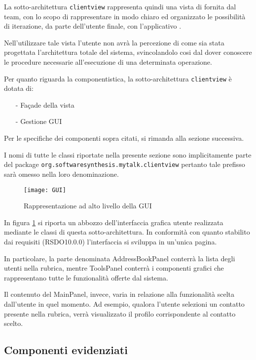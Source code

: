 La sotto-architettura \texttt{clientview} rappresenta quindi una vista di  fornita dal team, con lo scopo di rappresentare in modo chiaro ed organizzato le possibilità di iterazione, da parte dell'utente finale, con l'applicativo \caName.

Nell'utilizzare tale vista l'utente non avrà la percezione di come sia stata progettata l'architettura totale del sistema, svincolandolo cosi dal dover conoscere le procedure necessarie all'esecuzione di una determinata operazione.

Per quanto riguarda la componentistica, la sotto-architettura \texttt{clientview} è dotata di:
\begin{itemize}[noitemsep,nolistsep]
	\item[-] Façade della vista
	\item[-] Gestione GUI
\end{itemize}

Per le specifiche dei componenti sopra citati, si rimanda alla sezione successiva.

I nomi di tutte le classi riportate nella presente sezione sono implicitamente parte del package \texttt{org.softwaresynthesis.mytalk.clientview} pertanto tale prefisso sarà omesso nella loro denominazione.

\begin{figure}[h]
\centering
\texttt{[image: GUI]}
\caption{Rappresentazione ad alto livello della GUI}\label{fig:gui}
\end{figure}

In figura \ref{fig:gui} si riporta un abbozzo dell'interfaccia grafica utente realizzata mediante le classi di questa sotto-architettura. In conformità con quanto stabilito dai requisiti (RSDO10.0.0) l'interfaccia si sviluppa in un'unica pagina.

In particolare, la parte denominata AddressBookPanel conterrà la lista degli utenti nella rubrica, mentre ToolsPanel conterrà i componenti grafici che rappresentano tutte le funzionalità offerte dal sistema. 

Il contenuto del MainPanel, invece, varia in relazione alla funzionalità scelta dall'utente in quel momento. Ad esempio, qualora l'utente selezioni un contatto presente nella rubrica, verrà visualizzato il profilo corrispondente al contatto scelto.

\subsection{Componenti evidenziati}


